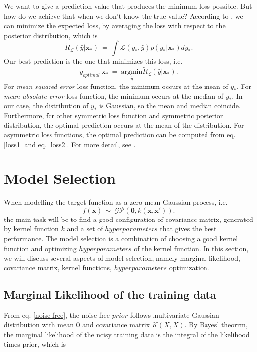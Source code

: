 \documentclass[11pt,a4paper]{article}
\theoremstyle{definition}
\newcommand{\GP}{\mathcal{GP}}
\numberwithin{equation}{section}
\let\vec\mathbf
\begin{document}
	We want to give a prediction value that produces the minimum loss possible. But how do we achieve that when we don't know the true value? According to \cite[Rasmussen and Williams, sec 2.4]{RandW}, we can minimize the expected loss, by averaging the loss with respect to the posterior distribution, which is 
	\begin{equation}\label{loss1}
	\tilde{R}_{\mathcal{L}}(\hat y|\vec x_*)\ = \ \int\mathcal{L}(y_*,\hat y)p(y_*|\vec x_*)dy_*.
	\end{equation}\label{loss2}
	Our best prediction is the one that minimizes this loss, i.e.
	\begin{equation}
	y_{optimal}|\vec x_*\ = \ \underset{\hat y}{\mathrm{argmin}}\tilde{R}_{\mathcal{L}}(\hat y|\vec x_*).
	\end{equation}
	For \textit{mean squared error} loss function, the minimum occurs at the mean of $y_*$. For \textit{mean absolute error} loss function, the minimum occurs at the median of $y_*$. In our case, the distribution of $y_*$ is Gaussian, so the mean and median coincide. Furthermore, for other symmetric loss function and symmetric posterior distribution, the optimal prediction occurs at the mean of the distribution. For asymmetric loss functions, the optimal prediction can be computed from eq. \ref{loss1} and eq. \ref{loss2}. For more detail, see \cite{Berger}.
	
	\newpage
	\section{Model Selection}\label{sec:model_selection}
	When modelling the target function as a zero mean Gaussian process, i.e.
	\begin{equation*} \label{}
	f(\vec x) \  \sim \ \GP\left(\vec 0,k(\vec{x},\vec{x'})  \right).
	\end{equation*}
	the main task will be to find a good configuration of covariance matrix, generated by kernel function $k$ and a set of $hyperparameters$ that gives the best performance. The model selection is a combination of choosing a good kernel function and optimizing $hyperparameters$ of the kernel function. In this section, we will discuss several aspects of model selection, namely marginal likelihood, covariance matrix, kernel functions, $hyperparameters$ optimization.
	
	\subsection{Marginal Likelihood of the training data}\label{lik}
	From eq. \ref{noise-free}, the noise-free $prior$ follows multivariate Gaussian distribution with mean $\vec 0$ and covariance matrix $K(X,X)$. By Bayes' theorrm, the marginal likelihood of the noisy training data is the integral of the likelihood times prior, which is 
	
\end{document}
